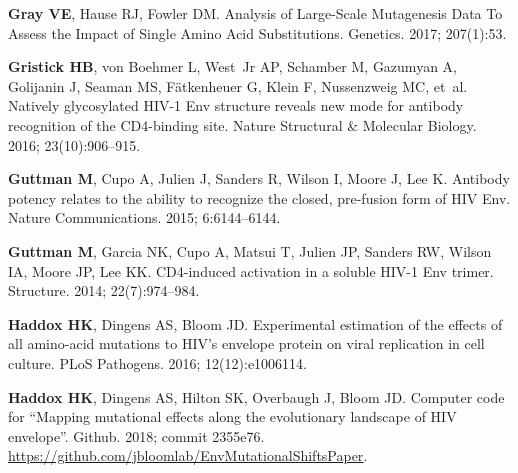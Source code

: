 \documentclass[9pt]{elife}
\begin{document}
\begin{thebibliography}{114}
\textbf{\color{eLifeMediumGrey} Gray VE}, Hause RJ, Fowler DM.
\newblock Analysis of Large-Scale Mutagenesis Data To Assess the Impact of
  Single Amino Acid Substitutions.
\newblock Genetics.  2017; 207(1):53.

\textbf{\color{eLifeMediumGrey} Gristick HB}, von Boehmer L, West~Jr AP,
  Schamber M, Gazumyan A, Golijanin J, Seaman MS, F{\"a}tkenheuer G, Klein F,
  Nussenzweig MC, et~al.
\newblock Natively glycosylated HIV-1 Env structure reveals new mode for
  antibody recognition of the CD4-binding site.
\newblock Nature Structural \& Molecular Biology.  2016; 23(10):906--915.

\textbf{\color{eLifeMediumGrey} Guttman M}, Cupo A, Julien J, Sanders R, Wilson
  I, Moore J, Lee K.
\newblock Antibody potency relates to the ability to recognize the closed,
  pre-fusion form of {HIV Env}.
\newblock Nature Communications.  2015; 6:6144--6144.

\textbf{\color{eLifeMediumGrey} Guttman M}, Garcia NK, Cupo A, Matsui T, Julien
  JP, Sanders RW, Wilson IA, Moore JP, Lee KK.
\newblock CD4-induced activation in a soluble HIV-1 Env trimer.
\newblock Structure.  2014; 22(7):974--984.

\textbf{\color{eLifeMediumGrey} Haddox HK}, Dingens AS, Bloom JD.
\newblock Experimental estimation of the effects of all amino-acid mutations to
  {HIV's} envelope protein on viral replication in cell culture.
\newblock PLoS Pathogens.  2016; 12(12):e1006114.

\textbf{\color{eLifeMediumGrey} Haddox HK}, Dingens AS, Hilton SK, Overbaugh J,
  Bloom JD.
\newblock Computer code for ``Mapping mutational effects along the evolutionary
  landscape of HIV envelope''.
\newblock Github.  2018; commit 2355e76.
\newblock
  \urlprefix\url{https://github.com/jbloomlab/EnvMutationalShiftsPaper}.


\end{thebibliography}
\end{document}
